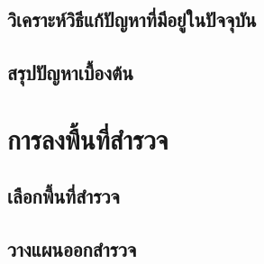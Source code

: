 \subsection{วิเคราะห์วิธีแก้ปัญหาที่มีอยู่ในปัจจุบัน}
 
\subsection{สรุปปัญหาเบื้องต้น}

\section{การลงพื้นที่สำรวจ}

\subsection{เลือกพี้นที่สำรวจ}

\subsection{วางแผนออกสำรวจ}


